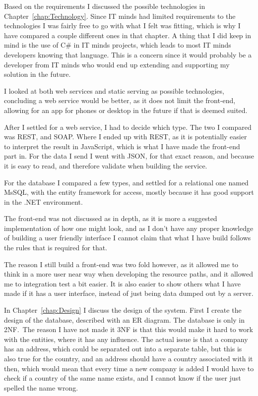 Based on the requirements I discussed the possible technologies in
Chapter~\ref{chap:Technology}. Since IT minds had limited requirements to the
technologies I was fairly free to go with what I felt was fitting, which is why
I have compared a couple different ones in that chapter. A thing that I did keep
in mind is the use of C\# in IT minds projects, which leads to most IT minds
developers knowing that language. This is a concern since it would probably be
a developer from IT minds who would end up extending and supporting my solution
in the future.

I looked at both web services and static serving as possible technologies,
concluding a web service would be better, as it does not limit the front-end,
allowing for an app for phones or desktop in the future if that is deemed suited.

After I settled for a web service, I had to decide which type. The two I
compared was REST, and SOAP. Where I ended up with REST, as it is potentially
easier to interpret the result in JavaScript, which is what I have made the
front-end part in. For the data I send  I went with JSON, for that exact reason,
and because it is easy to read, and therefore validate when building the service.

For the database I compared a few types, and settled for a relational one named
MsSQL, with the entity framework for access, mostly because it has good support
in the .NET environment.

The front-end was not discussed as in depth, as it is more a suggested
implementation of how one might look, and as I don't have any proper knowledge
of building a user friendly interface I cannot claim that what I have build
follows the rules that is required for that. 

The reason I still build a front-end was two fold however, as it allowed me to
think in a more user near way when developing the resource paths, and it allowed
me to integration test a bit easier. It is also easier to show others what I
have made if it has a user interface, instead of just being data dumped out by a server.

In Chapter~\ref{chap:Design} I discuss the design of the system. First I create
the design of the database, described with an ER diagram. The database is only
in 2NF.\ The reason I have not made it 3NF is that this would make it hard to
work with the entities, where it has any influence. The actual issue is that a
company has an address, which could be separated out into a separate table, but
this is also true for the country, and an address should have a country
associated with it then, which would mean that every time a new company is added
I would have to check if a country of the same name exists, and I cannot know if
the user just spelled the name wrong.

